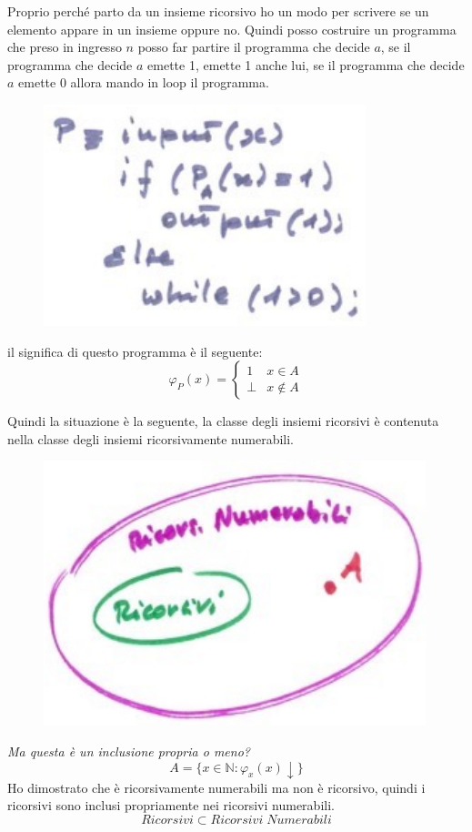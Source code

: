 \documentclass{article}
\begin{document}
Proprio perché parto da un insieme ricorsivo ho un modo per scrivere se un elemento
appare in un insieme oppure no. Quindi posso costruire un programma che preso
in ingresso $n$ posso far partire il programma che decide $a$, se il programma che decide
$a$ emette 1, emette 1 anche lui, se il programma che decide $a$ emette 0 allora mando in loop
il programma.
\begin{figure}[H]
    \centering
    \includegraphics[scale=0.6]{images/pdia.png}
\end{figure}
il significa di questo programma è il seguente:
\[
    \varphi_P(x)=
    \begin{cases}
        1 & x\in A\\
        \bot &x\notin A
    \end{cases}
\]

Quindi la situazione è la seguente, la classe degli insiemi ricorsivi è contenuta nella
classe degli insiemi ricorsivamente numerabili.
\begin{figure}[H]
    \centering
    \includegraphics[scale=0.6]{images/ric_ricenum.png}
\end{figure}
\textit{Ma questa è un inclusione
propria o meno?}
$$A=\{x\in\mathbb{N}:\varphi_x(x)\downarrow\}$$
Ho dimostrato che è ricorsivamente numerabili ma non è ricorsivo, quindi i ricorsivi
sono inclusi propriamente nei ricorsivi numerabili.
$$Ricorsivi \subset Ricorsivi\;Numerabili$$
\end{document}
